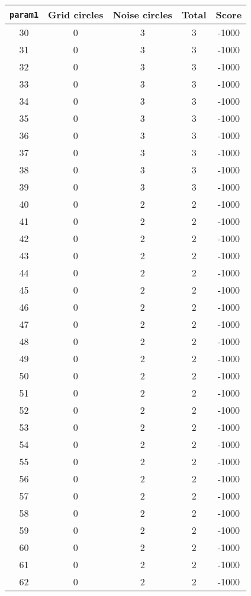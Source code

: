 \documentclass[letterpaper, 12pt]{article}
\begin{document}
\begin{longtable}{|c|c|c|c|c|}
\hline
\textbf{\texttt{param1}} & \textbf{Grid circles} & \textbf{Noise circles} & \textbf{Total} & \textbf{Score} \\
\hline
30 & 0 & 3 & 3 & -1000 \\
\hline
31 & 0 & 3 & 3 & -1000 \\
\hline
32 & 0 & 3 & 3 & -1000 \\
\hline
33 & 0 & 3 & 3 & -1000 \\
\hline
34 & 0 & 3 & 3 & -1000 \\
\hline
35 & 0 & 3 & 3 & -1000 \\
\hline
36 & 0 & 3 & 3 & -1000 \\
\hline
37 & 0 & 3 & 3 & -1000 \\
\hline
38 & 0 & 3 & 3 & -1000 \\
\hline
39 & 0 & 3 & 3 & -1000 \\
\hline
40 & 0 & 2 & 2 & -1000 \\
\hline
41 & 0 & 2 & 2 & -1000 \\
\hline
42 & 0 & 2 & 2 & -1000 \\
\hline
43 & 0 & 2 & 2 & -1000 \\
\hline
44 & 0 & 2 & 2 & -1000 \\
\hline
45 & 0 & 2 & 2 & -1000 \\
\hline
46 & 0 & 2 & 2 & -1000 \\
\hline
47 & 0 & 2 & 2 & -1000 \\
\hline
48 & 0 & 2 & 2 & -1000 \\
\hline
49 & 0 & 2 & 2 & -1000 \\
\hline
50 & 0 & 2 & 2 & -1000 \\
\hline
51 & 0 & 2 & 2 & -1000 \\
\hline
52 & 0 & 2 & 2 & -1000 \\
\hline
53 & 0 & 2 & 2 & -1000 \\
\hline
54 & 0 & 2 & 2 & -1000 \\
\hline
55 & 0 & 2 & 2 & -1000 \\
\hline
56 & 0 & 2 & 2 & -1000 \\
\hline
57 & 0 & 2 & 2 & -1000 \\
\hline
58 & 0 & 2 & 2 & -1000 \\
\hline
59 & 0 & 2 & 2 & -1000 \\
\hline
60 & 0 & 2 & 2 & -1000 \\
\hline
61 & 0 & 2 & 2 & -1000 \\
\hline
62 & 0 & 2 & 2 & -1000 \\

\end{longtable}
\end{document}
